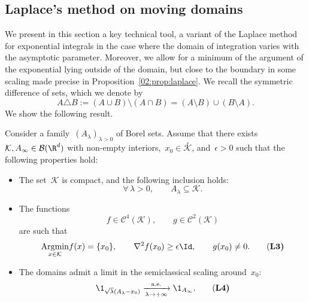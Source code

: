         \subsection{Laplace's method on moving domains}
        \label{02:subsec:laplace}
        We present in this section a key technical tool, a variant of the Laplace method for exponential integrals in the case where the domain of integration varies with the asymptotic parameter. Moreover, we allow for a minimum of the argument of the exponential lying outside of the domain, but close to the boundary in some scaling made precise in Proposition~\ref{02:prop:laplace}.
        We recall the symmetric difference of sets, which we denote by
        \[A\triangle B := (A\cup B) \setminus (A\cap B) = (A\setminus B) \cup (B\setminus A).\]
        We show the following result.
        \begin{proposition}
            \label{02:prop:laplace}
                Consider a family~$(A_\lambda)_{\lambda>0}$ of Borel sets. Assume that there exists~$\mathcal K,A_\infty\in \mathcal B(\R^d)$ with non-empty interiors,~$x_0\in \overset{\circ}{\mathcal K}$, and~$\epsilon >0$ such that the following properties hold:
                \begin{itemize}
                    \item{The set~$\mathcal K$ is compact, and the following inclusion holds: \begin{equation}\label{02:eq:laplace_l1}\forall\,\lambda >0,\qquad A_\lambda \subseteq \mathcal K. \tag{\bf L1}\end{equation}}
                    \item{The functions \begin{equation}\label{02:eq:laplace_l2}f \in \mathcal C^{4}(\mathcal K),\qquad g \in \mathcal C^{2}(\mathcal K) \tag{\bf L2}\end{equation} are such that \begin{equation}\label{02:eq:laplace_l3}\underset{x\in\mathcal K}{\mathrm{Argmin}} f(x) = \{x_0\},\qquad \nabla^2 f(x_0) \geq \epsilon\Id,\qquad g(x_0) \neq 0.\tag{\bf L3}\end{equation}}
                    \item{The domains admit a limit in the semiclassical scaling around~$x_0$: \begin{equation}\label{02:eq:laplace_l4} \1_{\sqrt\lambda(A_\lambda -x_0)} \xrightarrow[\lambda\to+\infty]{\text{a.e.}} \1_{A_\infty}.\tag{\bf L4}\end{equation}}
                \end{itemize}

\end{proposition}

